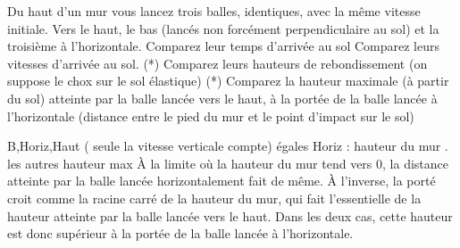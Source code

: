 \begin{Exercise}[title=Une balle sur un mur...]
	Du haut d'un mur vous lancez trois balles, identiques, avec la même vitesse
    initiale. Vers le haut, le bas (lancés non forcément perpendiculaire au sol)
    et la troisième à l'horizontale.
    \Question Comparez leur temps d'arrivée au sol
	\Question Comparez leurs vitesses d'arrivée au sol.
	\Question (*) Comparez leurs hauteurs de rebondissement (on suppose le chox
    sur le sol élastique)
    \Question (*) Comparez la hauteur maximale (à partir du sol) atteinte par la
    balle lancée vers le haut, à la portée de la balle lancée à l'horizontale
    (distance entre le pied du mur et le point d'impact sur le sol)
\end{Exercise}
\begin{Answer}
  \Question B,Horiz,Haut ( seule la vitesse verticale compte)
  \Question égales
  \Question Horiz : hauteur du mur . les autres hauteur max
  \Question À la limite où la hauteur du mur tend vers 0, la distance atteinte
  par la balle lancée horizontalement  fait de même. À l'inverse,  la porté
  croit comme la racine carré de la hauteur du mur, qui fait l'essentielle de la
  hauteur atteinte par la balle lancée vers le haut. Dans les deux cas, cette
  hauteur est donc supérieur à la portée de la balle lancée à l'horizontale.
\end{Answer}
